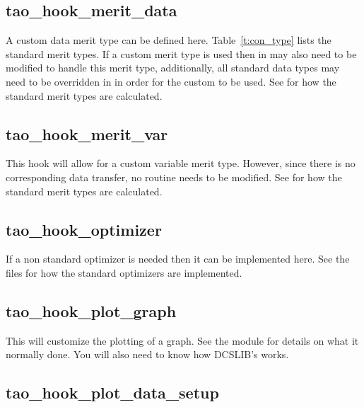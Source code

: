 {\subsection{tao\_hook\_merit\_data}

A custom data merit type can be defined here. Table~\ref{t:con_type}
lists the standard merit types. If a custom merit type is used then
 in  may also need to be
modified to handle this merit type, additionally, all standard data
types may need to be overridden in  in
order for the custom  to be used.  See
 for how the standard merit types are
calculated.

\subsection{tao\_hook\_merit\_var}

This hook will allow for a custom variable merit type. However, since
there is no corresponding data transfer, no  routine needs
to be modified.  See  for how the standard
merit types are calculated.

\subsection{tao\_hook\_optimizer}

If a non standard optimizer is needed then it can be implemented
here. See the  files for how the
standard optimizers are implemented.

\subsection{tao\_hook\_plot\_graph}

This will customize the plotting of a graph. See the \tao module
 for details on what it normally done. You will also need to know how
DCSLIB's  works.

\subsection{tao\_hook\_plot\_data\_setup}

}
